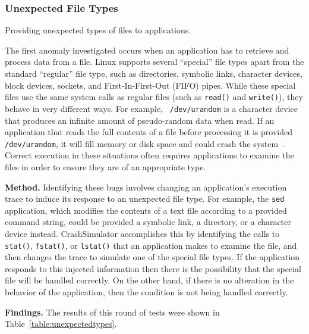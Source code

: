 
\subsubsection{Unexpected File Types}
\label{sec-file-type-bugs}
Providing unexpected types of files to
applications.

The first anomaly investigated occurs when an application has to retrieve
and process data from a file.  Linux supports several ``special'' file
types apart from the standard ``regular'' file type, such as
directories, symbolic links, character devices, block devices, sockets, and
First-In-First-Out (FIFO) pipes.  While these special files
use the same system calls as regular files (such as {\tt read()} and
{\tt write()}), they behave in very different ways.  For example, {\tt
/dev/urandom} is a character device that produces an infinite amount of
pseudo-random data when read.  If an application that reads the full
contents of a file before processing it is provided {\tt /dev/urandom}, it
will fill memory or disk space and could
crash the system~\cite{YumAptEndless}.
Correct execution in these situations often requires applications
to examine the files in order to ensure they are of an appropriate type.

{\bf Method.}  Identifying these bugs involves changing an application's
execution trace to induce its response to an unexpected file type.  For
example, the {\tt sed} application, which modifies the contents of a text
file according to a provided command string, could be provided a symbolic
link, a directory, or a character device instead.  CrashSimulator
accomplishes this by identifying the calls to {\tt stat()}, {\tt fstat()},
or {\tt lstat()} that an application makes to examine the file, and then
changes the trace to simulate
one of the special file types.  If the application responds to
this injected information then there is the possibility that the special
file will be handled correctly.  On the other hand, if there is no
alteration in the behavior of the application,  then the condition is not
being handled correctly.

{\bf Findings.}
The results of this round of tests were shown in
Table~\ref{table:unexpectedtypes}.

